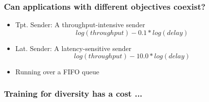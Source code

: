 \begin{frame}
\frametitle{Can applications with different objectives coexist?}
\begin{itemize}
\item Tpt. Sender: A throughput-intensive sender
\begin{equation}
log(throughput) - 0.1 * log(delay)
\end{equation}
\item Lat. Sender: A latency-sensitive sender
\begin{equation}
log(throughput) - 10.0 * log(delay)
\end{equation}
\item Running over a FIFO queue
\end{itemize}
\end{frame}

\begin{frame}
\frametitle{Training for diversity has a cost ...}
\begin{centering}

\noindent
{}


\end{centering}
\end{frame}
